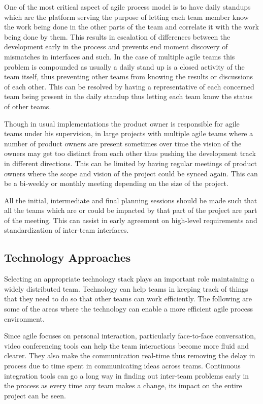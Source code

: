 	One of the most critical aspect of agile process model is to have daily standups which are the platform serving the purpose of letting each team member know the work being done in the other parts of the team and correlate it with the work being done by them.
	This results in escalation of differences between the development early in the process and prevents end moment discovery of mismatches in interfaces and such.
	In the case of multiple agile teams this problem is compounded as usually a daily stand up is a closed activity of the team itself, thus preventing other teams from knowing the results or discussions of each other.
	This can be resolved by having a representative of each concerned team being present in the daily standup thus letting each team know the status of other teams.

Though in usual implementations the product owner is responsible for agile teams under his supervision, in large projects with multiple agile teams where a number of product owners are present sometimes over time the vision of the owners may get too distinct from each other thus pushing the development track in different directions.
This can be limited by having regular meetings of product owners where the scope and vision of the project could be synced again. This can be a bi-weekly or monthly meeting depending on the size of the project.

All the initial, intermediate and final planning sessions should be made such that all the teams which are or could be impacted by that part of the project are part of the meeting.
This can assist in early agreement on high-level requirements and standardization of inter-team interfaces.

\subsection{Technology Approaches} \label{sec:tech_impv}
Selecting an appropriate technology stack plays an important role maintaining a widely distributed team.
Technology can help teams in keeping track of things that they need to do so that other teams can work efficiently.
The following are some of the areas where the technology can enable a more efficient agile process environment.

Since agile focuses on personal interaction, particularly face-to-face conversation, video conferencing tools can help the team interactions become more fluid and clearer.
They also make the communication real-time thus removing the delay in process due to time spent in communicating ideas across teams.
Continuous integration tools can go a long way in finding out inter-team problems early in the process as every time any team makes a change, its impact on the entire project can be seen.

